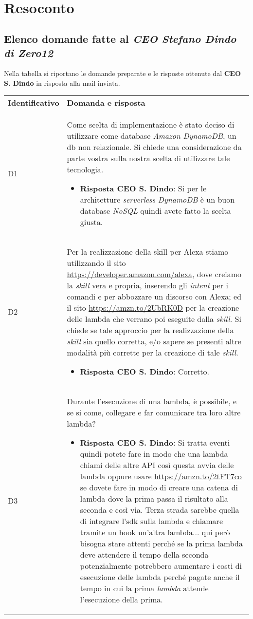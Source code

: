 \clearpage
\section{Resoconto}
	\subsection{Elenco domande fatte al \emph{CEO Stefano Dindo di Zero12}}
	Nella tabella si riportano le domande preparate e le risposte ottenute dal \textbf{CEO S. Dindo} in risposta alla mail inviata.
		\begin{center}
			\renewcommand{\arraystretch}{1.5}
			\begin{longtable}{  p{2.5cm} p{11.7cm} }
				\rowcolor{tableHeadYellow}
				\textbf{Identificativo}&\textbf{Domanda e risposta}\\
				D1 & Come scelta di implementazione è stato deciso di utilizzare come database \textit{Amazon DynamoDB}, un db non relazionale. Si chiede una considerazione da parte vostra sulla nostra scelta di utilizzare tale tecnologia.
				\begin{itemize}
					\item \textbf{Risposta CEO S. Dindo}: Si per le architetture \textit{serverless DynamoDB} è un buon database \textit{NoSQL} quindi avete fatto la scelta giusta. 
				\end{itemize}
				\\
				D2 & Per la realizzazione della skill per Alexa stiamo utilizzando il sito \href{https://developer.amazon.com/alexa}{https://developer.amazon.com/alexa}, dove creiamo la \textit{skill} vera e propria, inserendo gli \textit{intent} per i comandi e per abbozzare un discorso con Alexa;
				ed il sito \href{https://amzn.to/2UbRK0D}{https://amzn.to/2UbRK0D} per la creazione delle lambda che verrano poi eseguite dalla \textit{skill}.
				Si chiede se tale approccio per la realizzazione della \textit{skill} sia quello corretta, e/o sapere se presenti altre modalità più corrette per la creazione di tale \textit{skill}.
				\begin{itemize}
					\item \textbf{Risposta CEO S. Dindo}: Corretto.
				\end{itemize}
				\\
				D3 & Durante l'esecuzione di una lambda, è possibile, e se si come, collegare e far comunicare tra loro altre lambda? 
				\begin{itemize}
					\item \textbf{Risposta CEO S. Dindo}: Si tratta eventi quindi potete fare in modo che una lambda chiami delle altre API così questa avvia delle lambda oppure usare \href{https://amzn.to/2tFT7co}{https://amzn.to/2tFT7co} se dovete fare in modo di creare una catena di lambda dove la prima passa il risultato alla seconda e così via. Terza strada sarebbe quella di integrare l'sdk sulla lambda e chiamare tramite un hook un'altra lambda... qui però bisogna stare attenti perché se la prima lambda deve attendere il tempo della seconda potenzialmente potrebbero aumentare i costi di esecuzione delle lambda perché pagate anche il tempo in cui la prima \textit{lambda} attende l'esecuzione della prima.

\end{itemize}
\end{longtable}
\end{center}
